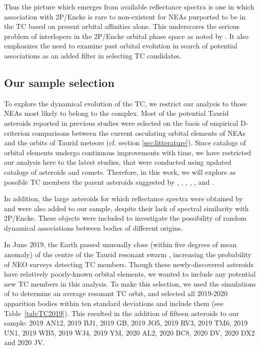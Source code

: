 \documentclass[letters,a4paper,fleqn,usenatbib]{mnras}
\begin{document}
Thus the picture which emerges from available reflectance spectra is one in which association with 2P/Encke is rare to non-existent for NEAs purported to be in the TC based on present orbital affinities alone. This underscores the serious problem of interlopers in the 2P/Encke orbital phase space as noted by \cite{Valsecchi1999}. It also emphasizes the need to examine past orbital evolution in search of potential associations as an added filter in selecting TC candidates. 

\subsection{Our sample selection}

To explore the dynamical evolution of the TC, we restrict our analysis to those NEAs most likely to belong to the complex. Most of the potential Taurid asteroids reported in previous studies were selected on the basis of empirical D-criterion comparisons between the current  osculating orbital elements of NEAs and the orbits of Taurid meteors (cf. section \ref{sec:litterature}). Since catalogs of orbital elements undergo continuous improvements with time, we have restricted our analysis here to the latest studies, that were conducted using updated catalogs of asteroids and comets. Therefore, in this work, we will explore as possible TC members the parent asteroids suggested by \cite{Porubcan2006}, \cite{Babadzhanov2008}, \cite{Brown2010}, \cite{Jopek2011}, \cite{Olech2016}, \cite{Dumitru2017} and \cite{Spurny2017}.

In addition, the large asteroids for which reflectance spectra were obtained by \cite{Popescu2014} and \cite{Tubiana2015} were also added to our sample, despite their lack of spectral similarity with 2P/Encke. These objects were included to investigate the possibility of random dynamical associations between bodies of different origins. 

In June 2019, the Earth passed unusually close (within five degrees of mean anomaly) of the centre of the Taurid resonant swarm \citep{clawiebro19}, increasing the probability of NEO surveys detecting TC members. Though these newly-discovered asteroids have relatively poorly-known orbital elements, we wanted to include any potential new TC members in this analysis. To make this selection, we used the simulations of \cite{clawiebro19} to determine an average resonant TC orbit, and selected all 2019-2020 apparition bodies within ten standard deviations and include them (see Table~\ref{tab:TC2019}). This resulted in the addition of fifteen asteroids to our sample: 2019 AN12, 2019 BJ1, 2019 GB, 2019 JO5, 2019 RV3, 2019 TM6, 2019 UN1, 2019 WB5, 2019 WJ4, 2019 YM, 2020 AL2, 2020 BC8, 2020 DV, 2020 DX2 and 2020 JV.
\end{document}
